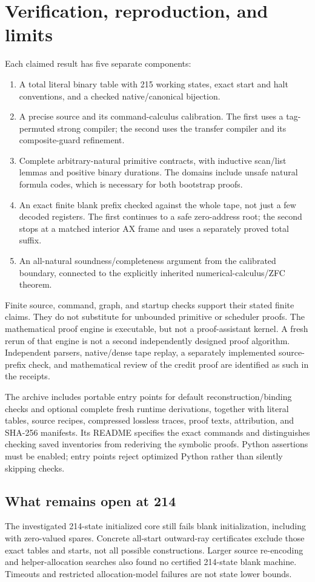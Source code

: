 \section{Verification, reproduction, and limits}
Each claimed result has five separate components:
\begin{enumerate}
\item A total literal binary table with 215 working states, exact start and halt conventions, and a checked native/canonical bijection.
\item A precise source and its command-calculus calibration. The first uses a tag-permuted strong compiler; the second uses the transfer compiler and its composite-guard refinement.
\item Complete arbitrary-natural primitive contracts, with inductive scan/list lemmas and positive binary durations. The domains include unsafe natural formula codes, which is necessary for both bootstrap proofs.
\item An exact finite blank prefix checked against the whole tape, not just a few decoded registers. The first continues to a safe zero-address root; the second stops at a matched interior AX frame and uses a separately proved total suffix.
\item An all-natural soundness/completeness argument from the calibrated boundary, connected to the explicitly inherited numerical-calculus/ZFC theorem.
\end{enumerate}
Finite source, command, graph, and startup checks support their stated finite claims. They do not substitute for unbounded primitive or scheduler proofs. The mathematical proof engine is executable, but not a proof-assistant kernel. A fresh rerun of that engine is not a second independently designed proof algorithm. Independent parsers, native/dense tape replay, a separately implemented source-prefix check, and mathematical review of the credit proof are identified as such in the receipts.

The archive includes portable entry points for default reconstruction/binding checks and optional complete fresh runtime derivations, together with literal tables, source recipes, compressed lossless traces, proof texts, attribution, and SHA-256 manifests. Its README specifies the exact commands and distinguishes checking saved inventories from rederiving the symbolic proofs. Python assertions must be enabled; entry points reject optimized Python rather than silently skipping checks.

\subsection{What remains open at 214}
The investigated 214-state initialized core still fails blank initialization, including with zero-valued spares. Concrete all-start outward-ray certificates exclude those exact tables and starts, not all possible constructions. Larger source re-encoding and helper-allocation searches also found no certified 214-state blank machine. Timeouts and restricted allocation-model failures are not state lower bounds.

